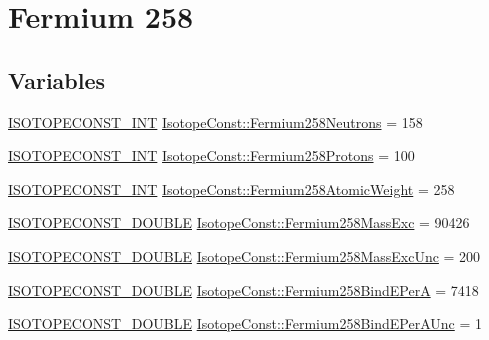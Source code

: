\hypertarget{group___isotope_const-_fermium-_fm258}{}\section{Fermium 258}
\label{group___isotope_const-_fermium-_fm258}
\subsection*{Variables}
\begin{DoxyCompactItemize}
\item 
\mbox{\hyperlink{group___isotope_const-_macros_ga5f18360b3e99483a35c32d789e62621c}{I\+S\+O\+T\+O\+P\+E\+C\+O\+N\+S\+T\+\_\+\+I\+NT}} \mbox{\hyperlink{group___isotope_const-_fermium-_fm258_gab51ed0aeef3e3e41e9450b7a2d2b4799}{Isotope\+Const\+::\+Fermium258\+Neutrons}} = 158
\item 
\mbox{\hyperlink{group___isotope_const-_macros_ga5f18360b3e99483a35c32d789e62621c}{I\+S\+O\+T\+O\+P\+E\+C\+O\+N\+S\+T\+\_\+\+I\+NT}} \mbox{\hyperlink{group___isotope_const-_fermium-_fm258_ga4fbe8e56c5d0de9fbb5d10cf72da4d2a}{Isotope\+Const\+::\+Fermium258\+Protons}} = 100
\item 
\mbox{\hyperlink{group___isotope_const-_macros_ga5f18360b3e99483a35c32d789e62621c}{I\+S\+O\+T\+O\+P\+E\+C\+O\+N\+S\+T\+\_\+\+I\+NT}} \mbox{\hyperlink{group___isotope_const-_fermium-_fm258_gaa660d2d35e9c606021378f595f7ea0ce}{Isotope\+Const\+::\+Fermium258\+Atomic\+Weight}} = 258
\item 
\mbox{\hyperlink{group___isotope_const-_macros_ga8f45a7272ce02c0b4c65c44636ed719a}{I\+S\+O\+T\+O\+P\+E\+C\+O\+N\+S\+T\+\_\+\+D\+O\+U\+B\+LE}} \mbox{\hyperlink{group___isotope_const-_fermium-_fm258_ga9c382c2a2ec8a3160878473bfff35c92}{Isotope\+Const\+::\+Fermium258\+Mass\+Exc}} = 90426
\item 
\mbox{\hyperlink{group___isotope_const-_macros_ga8f45a7272ce02c0b4c65c44636ed719a}{I\+S\+O\+T\+O\+P\+E\+C\+O\+N\+S\+T\+\_\+\+D\+O\+U\+B\+LE}} \mbox{\hyperlink{group___isotope_const-_fermium-_fm258_ga606f2a76ce2dded186852b2d1a34f031}{Isotope\+Const\+::\+Fermium258\+Mass\+Exc\+Unc}} = 200
\item 
\mbox{\hyperlink{group___isotope_const-_macros_ga8f45a7272ce02c0b4c65c44636ed719a}{I\+S\+O\+T\+O\+P\+E\+C\+O\+N\+S\+T\+\_\+\+D\+O\+U\+B\+LE}} \mbox{\hyperlink{group___isotope_const-_fermium-_fm258_gaeed5ce950bc03ba33658a3eff3dd71b1}{Isotope\+Const\+::\+Fermium258\+Bind\+E\+PerA}} = 7418
\item 
\mbox{\hyperlink{group___isotope_const-_macros_ga8f45a7272ce02c0b4c65c44636ed719a}{I\+S\+O\+T\+O\+P\+E\+C\+O\+N\+S\+T\+\_\+\+D\+O\+U\+B\+LE}} \mbox{\hyperlink{group___isotope_const-_fermium-_fm258_ga221f289fdff86a2a538171e77956dbe2}{Isotope\+Const\+::\+Fermium258\+Bind\+E\+Per\+A\+Unc}} = 1

\end{DoxyCompactItemize}

